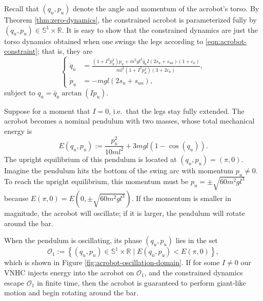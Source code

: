 \documentclass[journal,twoside,web]{ieeecolor}
\newcommand*{\R}{\mathbb{R}}
\newcommand*{\Sone}{\mathbb{S}^1}
\newcommand*{\SxR}{\Sone \times \R}
\begin{document}
Recall that \((q_u, p_u)\) denote the angle and momentum of the acrobot's torso.
By Theorem \ref{thm:zero-dynamics}, the constrained acrobot is parameterized
fully by \((q_u,p_u) \in \SxR\).
It is easy to show that the constrained dynamics are
just the torso dynamics obtained when one swings the legs
according to \eqref{eqn:acrobot-constraint}; that is, they are
\begin{equation}\label{eqn:acrobot-constrained-dynamics}
    \begin{cases}
    \dot{q}_u &= \frac{(1+I^2 p_u^2)p_u + m^2gl^3\bar{q}_a I(2s_u + s_{ua})(1+c_a) }
            {ml^2(1+I^2 p_u^2)(3+2c_a)}
    ,    \\
    \dot{p}_u &= - m g l (2s_u + s_{ua})
    ,
    \end{cases}
\end{equation}
subject to \(q_a = \bar{q}_a \arctan(I p_u)\).

Suppose for a moment that \(I = 0\), i.e.~that the legs stay fully extended.
The acrobot becomes a nominal pendulum with two masses, whose total mechanical
energy is
\begin{equation}\label{eqn:acrobot-energy}
    E(q_u,p_u) := \frac{p_u^2}{10ml^2} + 3mgl(1 - \cos(q_u))
    .
\end{equation}
The upright equilibrium of this pendulum is located at \((q_u,p_u) = (\pi,0)\).
Imagine the pendulum hits the bottom of the swing arc with momentum 
\(p_u \neq 0\). 
To reach the upright equilibrium, this momentum must be
\(p_u = \pm\sqrt{60m^2gl^3}\) because \(E(\pi,0) = E(0,\pm\sqrt{60m^2gl^3})\).
If the momentum is smaller in magnitude, the acrobot will oscillate; 
if it is larger, the pendulum will rotate around the bar.

When the pendulum is oscillating, its phase \((q_u,p_u)\) lies in the set
\begin{equation}\label{eqn:oscillation-domain}
    \mathcal{O}_1 := \left\{(q_u,p_u) \in \SxR 
    \mid E(q_u,p_u) < E(\pi,0) \right\}
    ,
\end{equation}
which is shown in Figure \ref{fig:acrobot-oscillation-domain}.
If for some \(I \neq 0\) our VNHC injects energy into the acrobot on 
\(\mathcal{O}_1\), and the constrained dynamics escape
\(\mathcal{O}_1\) in finite time, then the acrobot is guaranteed to perform
giant-like motion and begin rotating around the bar.
\end{document}
